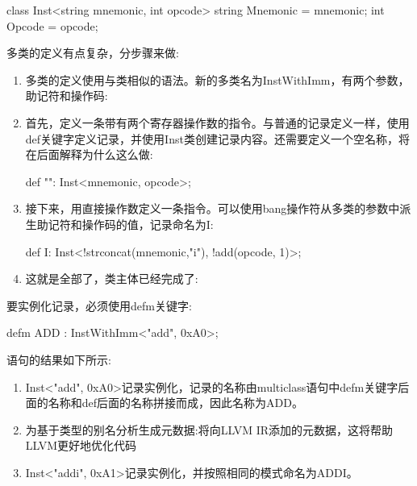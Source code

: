 \begin{shell}
class Inst<string mnemonic, int opcode> {
    string Mnemonic = mnemonic;
    int Opcode = opcode;
}
\end{shell}

多类的定义有点复杂，分步骤来做:

\begin{enumerate}
\item
多类的定义使用与类相似的语法。新的多类名为InstWithImm，有两个参数，助记符和操作码:

\begin{shell}
multiclass InstWithImm<string mnemonic, int opcode> {
\end{shell}

\item
首先，定义一条带有两个寄存器操作数的指令。与普通的记录定义一样，使用def关键字定义记录，并使用Inst类创建记录内容。还需要定义一个空名称，将在后面解释为什么这么做:

\begin{shell}
    def "": Inst<mnemonic, opcode>;
\end{shell}

\item
接下来，用直接操作数定义一条指令。可以使用bang操作符从多类的参数中派生助记符和操作码的值，记录命名为I:

\begin{shell}
    def I: Inst<!strconcat(mnemonic,"i"), !add(opcode, 1)>;
\end{shell}

\item
这就是全部了，类主体已经完成了:

\begin{shell}
}
\end{shell}
\end{enumerate}

要实例化记录，必须使用defm关键字:

\begin{shell}
defm ADD : InstWithImm<"add", 0xA0>;
\end{shell}

语句的结果如下所示:

\begin{enumerate}
\item
Inst<"add", 0xA0>记录实例化，记录的名称由multiclass语句中defm关键字后面的名称和def后面的名称拼接而成，因此名称为ADD。

\item
为基于类型的别名分析生成元数据:将向LLVM IR添加的元数据，这将帮助LLVM更好地优化代码

\item
Inst<"addi", 0xA1>记录实例化，并按照相同的模式命名为ADDI。
\end{enumerate}

